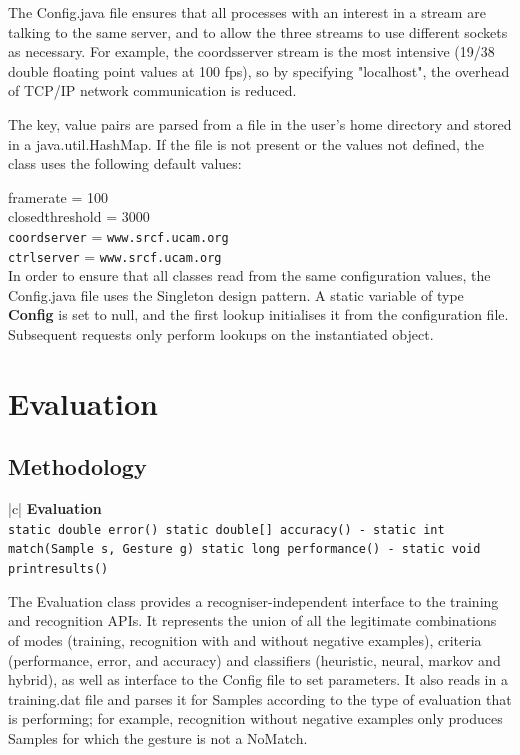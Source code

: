 \documentclass[12pt,a4,notitlepage]{report}
\renewcommand{\_}{\texttt{\symbol{95}}}
\newcommand{\<}{\texttt{\symbol{60}}}
\renewcommand{\>}{\texttt{\symbol{62}}}
\newcommand{\class}[1]{\textbf{#1}}
\newcommand{\variable}[1]{\texttt{#1}}
\begin{document}
The Config.java file ensures that all processes with an interest in a stream are talking to the same server, and to allow the three streams to use different sockets as necessary. For example, the coordsserver stream is the most intensive (19/38 double floating point values at 100 fps), so by specifying "localhost", the overhead of TCP/IP network communication is reduced.

The \<key, value\> pairs are parsed from a file in the user's home directory and stored in a java.util.HashMap. If the file is not present or the values not defined, the class uses the following default values:

framerate = 100 \\
closedthreshold = 3000 \\
\variable{coordserver} = \verb^www.srcf.ucam.org^ \\
\variable{ctrlserver} = \verb^www.srcf.ucam.org^ \\

In order to ensure that all classes read from the same configuration values, the Config.java file uses the Singleton design pattern. A static variable of type \class{Config} is set to null, and the first lookup initialises it from the configuration file. Subsequent requests only perform lookups on the instantiated object.

\chapter{Evaluation}

\section{Methodology}

\begin{tabular}{|c|} \hline 
\class{Evaluation} \\ \hline
{}
{\variable{static double error() \newline
static double[] accuracy() \newline
- static int match(Sample s, Gesture g) \newline
static long performance() \newline
- static void print\_results()
} } \\ \hline
\end{tabular}

The Evaluation class provides a recogniser-independent interface to the training and recognition APIs. It represents the union of all the legitimate combinations of modes (training, recognition with and without negative examples), criteria (performance, error, and accuracy) and classifiers (heuristic, neural, markov and hybrid), as well as interface to the Config file to set parameters. It also reads in a training.dat file and parses it for Samples according to the type of evaluation that is performing; for example, recognition without negative examples only produces Samples for which the gesture is not a NoMatch.
\end{document}
